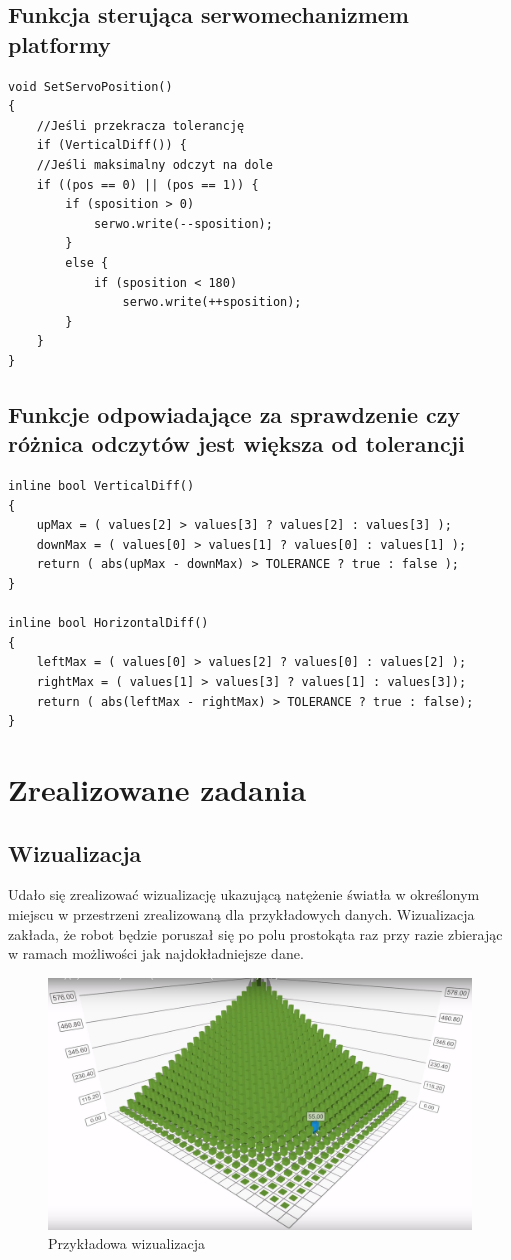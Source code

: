 \documentclass[10pt, a4paper]{article}
\begin{document}
\subsection{Funkcja sterująca serwomechanizmem platformy}
\begin{lstlisting}[tabsize=2]
void SetServoPosition()
{
	//Jeśli przekracza tolerancję
	if (VerticalDiff()) {
	//Jeśli maksimalny odczyt na dole
	if ((pos == 0) || (pos == 1)) {
		if (sposition > 0)
			serwo.write(--sposition);
		}
		else {
			if (sposition < 180)
				serwo.write(++sposition);
		}
	}
}
\end{lstlisting}

\subsection{Funkcje odpowiadające za sprawdzenie czy różnica odczytów jest większa od tolerancji}
\begin{lstlisting}[tabsize=2]
inline bool VerticalDiff()
{
	upMax = ( values[2] > values[3] ? values[2] : values[3] );
	downMax = ( values[0] > values[1] ? values[0] : values[1] );
	return ( abs(upMax - downMax) > TOLERANCE ? true : false );
}

inline bool HorizontalDiff()
{
	leftMax = ( values[0] > values[2] ? values[0] : values[2] );
	rightMax = ( values[1] > values[3] ? values[1] : values[3]);
	return ( abs(leftMax - rightMax) > TOLERANCE ? true : false);
}
\end{lstlisting}

\section{Zrealizowane zadania}
\subsection{Wizualizacja}
Udało się zrealizować wizualizację ukazującą natężenie światła w określonym miejscu w przestrzeni zrealizowaną dla przykładowych danych. Wizualizacja zakłada, że robot będzie poruszał się po polu prostokąta raz przy razie zbierając w ramach możliwości jak najdokładniejsze dane.
\begin{figure}[H]
\centering
\includegraphics[width=1\textwidth]{figures/wiz.png}
\caption{Przykładowa wizualizacja}
\end{figure}
\end{document}
